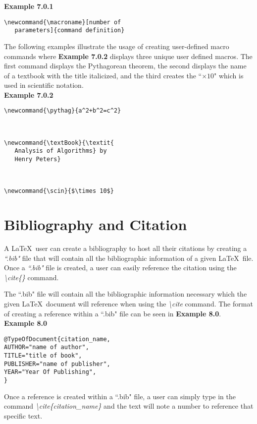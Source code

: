 \documentclass[11pt,twocolumn]{article}
\begin{document}
\noindent \textbf{Example 7.0.1}
\begin{verbatim}
\newcommand{\macroname}[number of
   parameters]{command definition}
\end{verbatim}

The following examples illustrate the usage of creating user-defined macro commands where \textbf{Example 7.0.2} displays three unique user defined macros. The first command displays the Pythagorean theorem, the second displays the name of a textbook with the title italicized, and the third creates the ``$\times 10$" which is used in scientific notation.\\

\noindent \textbf{Example 7.0.2}
\begin{verbatim}
\newcommand{\pythag}{a^2+b^2=c^2}
\end{verbatim}
\\
\begin{verbatim}
\newcommand{\textBook}{\textit{
   Analysis of Algorithms} by 
   Henry Peters}
\end{verbatim}
\\
\begin{verbatim}
\newcommand{\scin}{$\times 10$}
\end{verbatim}

\section{Bibliography and Citation}
A \LaTeX\ user can create a bibliography to host all their citations by creating a \textit{``.bib"} file that will contain all the bibliographic information of a given \LaTeX\ file. Once a \textit{``.bib"} file is created, a user can easily reference the citation using the \textit{ \textbackslash cite\{\}} command.

The ``.bib" file will contain all the bibliographic information necessary which the given \LaTeX\ document will reference when using the \textit{ \textbackslash cite} command. The format of creating a reference within a ``.bib" file can be seen in \textbf{Example 8.0}.\\

\noindent \textbf{Example 8.0}
\begin{verbatim}
@TypeOfDocument{citation_name,
AUTHOR="name of author",
TITLE="title of book",
PUBLISHER="name of publisher",
YEAR="Year Of Publishing",
}
\end{verbatim}

Once a reference is created within a ``.bib" file, a user can simply type in the command \textit{\textbackslash cite\{citation\_name\}} and the text will note a number to reference that specific text.
\end{document}

